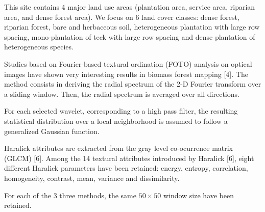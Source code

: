 \documentclass[paper=a4, fontsize=11pt]{scrartcl}
\begin{document}
This site contains 4 major land use areas (plantation area, service area, riparian area, and dense forest area).
We focus on 6 land cover classes: dense forest, riparian forest, bare and herbaceous soil, heterogeneous plantation with large row spacing, mono-plantation of teck with large row spacing and dense plantation of heterogeneous species.

Studies based on Fourier-based textural ordination (FOTO) analysis on optical images have shown very interesting results in biomass forest mapping [4].
The method consists in deriving the radial spectrum of the 2-D Fourier transform over a sliding window. 
Then, the radial spectrum is averaged over all directions.

For each selected wavelet, corresponding to a high pass filter, the resulting statistical distribution over a local neighborhood is assumed to follow a generalized Gaussian function.

Haralick attributes are extracted from the gray level co-ocurrence matrix (GLCM) [6].
Among the 14 textural attributes introduced by Haralick [6], eight different Haralick parameters have been retained: energy, entropy, correlation, homogeneity, contrast, mean, variance and dissimilarity.

For each of the 3 three methods, the same $50 \times 50$ window size have been retained.
\end{document}
